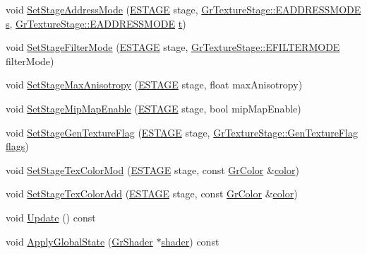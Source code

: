 \begin{CompactItemize}
\item 
void \hyperlink{class_gr_texture_set_1890ebcb02d234fefa1f732d08c54035}{SetStageAddressMode} (\hyperlink{_gr_config_8h_6df36e6af6bdeed00ff250f968160688}{ESTAGE} stage, \hyperlink{class_gr_texture_stage_dea63364bc3369d0cf5ef74b76268d0e}{GrTextureStage::EADDRESSMODE} \hyperlink{glext__bak_8h_d585a1393cfa368fa9dc3d8ebff640d5}{s}, \hyperlink{class_gr_texture_stage_dea63364bc3369d0cf5ef74b76268d0e}{GrTextureStage::EADDRESSMODE} \hyperlink{glext__bak_8h_00140d6f5c548b26daf170bf16e86a6d}{t})
\item 
void \hyperlink{class_gr_texture_set_f5f363721577f3292710f2c9fb87a533}{SetStageFilterMode} (\hyperlink{_gr_config_8h_6df36e6af6bdeed00ff250f968160688}{ESTAGE} stage, \hyperlink{class_gr_texture_stage_b86144a2e97311bb975db7c2c361f048}{GrTextureStage::EFILTERMODE} filterMode)
\item 
void \hyperlink{class_gr_texture_set_fdcf0c1c4c381358c7c96c99669e5053}{SetStageMaxAnisotropy} (\hyperlink{_gr_config_8h_6df36e6af6bdeed00ff250f968160688}{ESTAGE} stage, float maxAnisotropy)
\item 
void \hyperlink{class_gr_texture_set_6ce6f42858927200277598b47080f125}{SetStageMipMapEnable} (\hyperlink{_gr_config_8h_6df36e6af6bdeed00ff250f968160688}{ESTAGE} stage, bool mipMapEnable)
\item 
void \hyperlink{class_gr_texture_set_8f996772ab64a180e260d4e6d311f707}{SetStageGenTextureFlag} (\hyperlink{_gr_config_8h_6df36e6af6bdeed00ff250f968160688}{ESTAGE} stage, \hyperlink{class_gr_texture_stage_60f59a039bf1c95b76659752ff1bf7d6}{GrTextureStage::GenTextureFlag} \hyperlink{_u_t_message_8h_0a3c0b351ab09281b662a9ff4f900a53}{flags})
\item 
void \hyperlink{class_gr_texture_set_33494fb6526112643fbd6f98b86bc15a}{SetStageTexColorMod} (\hyperlink{_gr_config_8h_6df36e6af6bdeed00ff250f968160688}{ESTAGE} stage, const \hyperlink{class_gr_color}{GrColor} \&\hyperlink{glext_8h_3ea846f998d64f079b86052b6c4193a8}{color})
\item 
void \hyperlink{class_gr_texture_set_9c070e7bbebf0a430d44f102f3c1e4e1}{SetStageTexColorAdd} (\hyperlink{_gr_config_8h_6df36e6af6bdeed00ff250f968160688}{ESTAGE} stage, const \hyperlink{class_gr_color}{GrColor} \&\hyperlink{glext_8h_3ea846f998d64f079b86052b6c4193a8}{color})
\item 
void \hyperlink{class_gr_texture_set_771bfcf964c94d73241cc581b9c46835}{Update} () const 
\item 
void \hyperlink{class_gr_texture_set_974058b8d0d8f04b85807f52ae857a63}{ApplyGlobalState} (\hyperlink{class_gr_shader}{GrShader} $\ast$\hyperlink{glext_8h_57b2a96adb1d51204909a82d861e395e}{shader}) const 

\end{CompactItemize}
